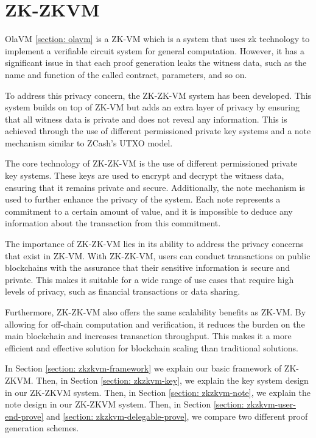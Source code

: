 \section{ZK-ZKVM} \label{sec:zkzkvm}

OlaVM \ref{section: olavm} is a ZK-VM which is a system that uses zk technology to implement a verifiable circuit system for general computation. However, it has a significant issue in that each proof generation leaks the witness data, such as the name and function of the called contract, parameters, and so on.

To address this privacy concern, the ZK-ZK-VM system has been developed. This system builds on top of ZK-VM but adds an extra layer of privacy by ensuring that all witness data is private and does not reveal any information. This is achieved through the use of different permissioned private key systems and a note mechanism similar to ZCash's UTXO model.

The core technology of ZK-ZK-VM is the use of different permissioned private key systems. These keys are used to encrypt and decrypt the witness data, ensuring that it remains private and secure. Additionally, the note mechanism is used to further enhance the privacy of the system. Each note represents a commitment to a certain amount of value, and it is impossible to deduce any information about the transaction from this commitment.

The importance of ZK-ZK-VM lies in its ability to address the privacy concerns that exist in ZK-VM. With ZK-ZK-VM, users can conduct transactions on public blockchains with the assurance that their sensitive information is secure and private. This makes it suitable for a wide range of use cases that require high levels of privacy, such as financial transactions or data sharing.

Furthermore, ZK-ZK-VM also offers the same scalability benefits as ZK-VM. By allowing for off-chain computation and verification, it reduces the burden on the main blockchain and increases transaction throughput. This makes it a more efficient and effective solution for blockchain scaling than traditional solutions.

In Section \ref{section: zkzkvm-framework} we explain our basic framework of ZK-ZKVM. Then, in Section \ref{section: zkzkvm-key}, we explain the key system design in our ZK-ZKVM system. Then, in Section \ref{section: zkzkvm-note}, we explain the note design in our ZK-ZKVM system. Then, in Section \ref{section: zkzkvm-user-end-prove} and \ref{section: zkzkvm-delegable-prove}, we compare two different proof generation schemes.






